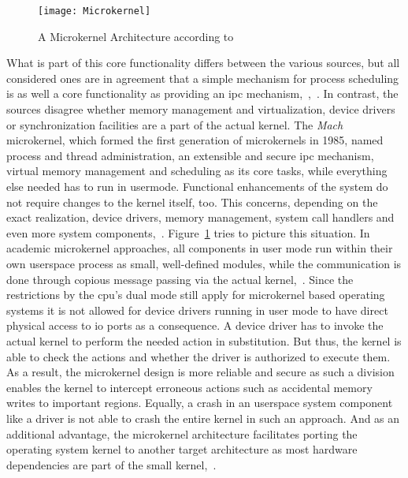 \begin{figure} [t]
	\centering
	\texttt{[image: Microkernel]}
	\caption{A Microkernel Architecture according to~\cite{lfd430}}\label{pic:microkernel}
\end{figure}

What is part of this core functionality differs between the various sources, but all considered ones are in agreement that a simple mechanism for process scheduling is as well a core functionality as providing an \ac{ipc} mechanism\cite{lfd430},~\cite{silberschatz2009operating},~\cite{glatz2015betriebssysteme}.  
In contrast, the sources disagree whether memory management and virtualization, device drivers or synchronization facilities are a part of the actual kernel.
The \textit{Mach} microkernel, which formed the first generation of microkernels in 1985, named process and thread administration, an extensible and secure \ac{ipc} mechanism, virtual memory management and scheduling as its core tasks, while everything else needed has to run in usermode\cite{rashidMach}.
Functional enhancements of the system do not require changes to the kernel itself, too.
This concerns, depending on the exact realization, device drivers, memory management, system call handlers and even more system components\cite{lfd430},~\cite{silberschatz2009operating}.
Figure~\ref{pic:microkernel} tries to picture this situation.
In academic microkernel approaches, all components in user mode run within their own userspace process as small, well-defined modules, while the communication is done through copious message passing via the actual kernel\cite{tanenbaum-modern-operating-systems},~\cite{lfd430}.
Since the restrictions by the \ac{cpu}'s dual mode still apply for microkernel based operating systems it is not allowed for device drivers running in user mode to have direct physical access to \ac{io} ports as a consequence.
A device driver has to invoke the actual kernel to perform the needed action in substitution.
But thus, the kernel is able to check the actions and whether the driver is authorized to execute them.
As a result, the microkernel design is more reliable and secure as such a division enables the kernel to intercept erroneous actions such as accidental memory writes to important regions\cite{tanenbaum-modern-operating-systems}.
Equally, a crash in an userspace system component like a driver is not able to crash the entire kernel in such an approach. 
And as an additional advantage, the microkernel architecture facilitates porting the operating system kernel to another target architecture as most hardware dependencies are part of the small kernel\cite{silberschatz2009operating},~\cite{lfd430}.

